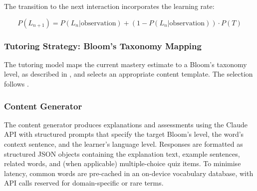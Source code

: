 The transition to the next interaction incorporates the learning rate:

\begin{equation}
P(L_{n+1}) = P(L_n | \text{observation}) + (1 - P(L_n | \text{observation})) \cdot P(T)
\label{eq:bkt_transition}
\end{equation}

\subsubsection{Tutoring Strategy: Bloom's Taxonomy Mapping}

The tutoring model maps the current mastery estimate to a Bloom's taxonomy level, as described in , and selects an appropriate content template. The selection follows .

\begin{algorithm}[htbp]
\caption{Adaptive content selection based on BKT mastery estimate}
\label{alg:content_selection}
\end{algorithm}

\subsubsection{Content Generator}

The content generator produces explanations and assessments using the Claude API with structured prompts that specify the target Bloom's level, the word's context sentence, and the learner's language level. Responses are formatted as structured JSON objects containing the explanation text, example sentences, related words, and (when applicable) multiple-choice quiz items. To minimise latency, common words are pre-cached in an on-device vocabulary database, with API calls reserved for domain-specific or rare terms.

